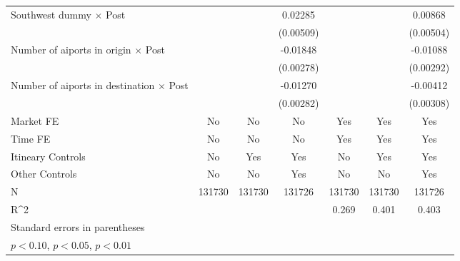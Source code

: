 \begin{table}[htbp]
\begin{tabular}{l*{6}{c}}
\addlinespace
Southwest dummy $\times$ Post&                     &                     &     0.02285\sym{***}&                     &                     &     0.00868\sym{*}  \\
                    &                     &                     &   (0.00509)         &                     &                     &   (0.00504)         \\
\addlinespace
Number of aiports in origin $\times$ Post&                     &                     &    -0.01848\sym{***}&                     &                     &    -0.01088\sym{***}\\
                    &                     &                     &   (0.00278)         &                     &                     &   (0.00292)         \\
\addlinespace
Number of aiports in destination $\times$ Post&                     &                     &    -0.01270\sym{***}&                     &                     &    -0.00412         \\
                    &                     &                     &   (0.00282)         &                     &                     &   (0.00308)         \\
\midrule
Market FE           &          No         &          No         &          No         &         Yes         &         Yes         &         Yes         \\
Time FE             &          No         &          No         &          No         &         Yes         &         Yes         &         Yes         \\
Itineary Controls   &          No         &         Yes         &         Yes         &          No         &         Yes         &         Yes         \\
Other Controls      &          No         &          No         &         Yes         &          No         &          No         &         Yes         \\
N                   &      131730         &      131730         &      131726         &      131730         &      131730         &      131726         \\
R^2                 &                     &                     &                     &       0.269         &       0.401         &       0.403         \\
\bottomrule
\multicolumn{7}{l}{\footnotesize Standard errors in parentheses}\\
\multicolumn{7}{l}{\footnotesize \sym{*} \(p<0.10\), \sym{**} \(p<0.05\), \sym{***} \(p<0.01\)}\\
\end{tabular}
\end{table}
